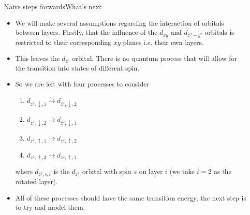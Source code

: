 \documentclass[9pt]{beamer}
\begin{document}
\begin{frame}{Naive steps forwards}{What's next}
  \begin{itemize}
    \item We will make several assumptions regarding the interaction of orbitals between layers. Firstly, that the influence of the $d_{xy}$ and $d_{x^2-y^2}$ orbitals is restricted to their corresponding $xy$ planes i.e. their own layers.

    \item This leaves the $d_{z^2}$ orbital. There is no quantum process that will allow for the transition into states of different spin.

    \item{So we are left with four processes to consider

      \begin{enumerate}
        \item $d_{z^2, \downarrow, 1} \rightarrow d_{z^2, \downarrow, 2}$
        \item $d_{z^2, \downarrow, 2} \rightarrow d_{z^2, \downarrow, 1}$
        \item $d_{z^2, \uparrow, 1} \rightarrow d_{z^2, \uparrow, 2}$
        \item $d_{z^2, \uparrow, 2} \rightarrow d_{z^2, \uparrow, 1}$
      \end{enumerate}

      where $d_{z^2, s, i}$ is the $d_{z^2}$ orbital with spin $s$ on layer $i$ (we take $i=2$ as the rotated layer).
      }

    \item All of these processes should have the same transition energy, the next step is to try and model them.
  \end{itemize}
\end{frame}
\end{document}

